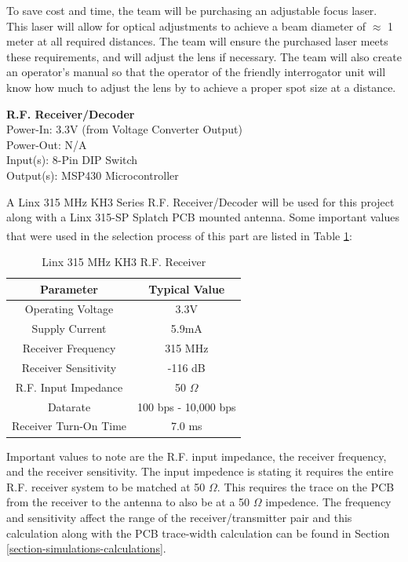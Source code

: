 \documentclass[letterpaper,10pt]{article}
\begin{document}
\begin{spacing}{1.15}
To save cost and time, the team will be purchasing an adjustable focus laser. This laser will allow for optical adjustments to achieve a beam diameter of $\approx$ 1 meter at all required distances. The team will ensure the purchased laser meets these requirements, and will adjust the lens if necessary. The team will also create an operator's manual so that the operator of the friendly interrogator unit will know how much to adjust the lens by to achieve a proper spot size at a distance.

\normalsize\textbf{R.F. Receiver/Decoder} \\
Power-In: 3.3V (from Voltage Converter Output) \\
Power-Out: N/A \\
Input(s): 8-Pin DIP Switch\\
Output(s): MSP430 Microcontroller

A Linx 315 MHz KH3 Series R.F. Receiver/Decoder will be used for this project along with a Linx 315-SP Splatch PCB mounted antenna. Some important values that were used in the selection process of this part are listed in Table \ref{tab:rf-receiver-important-values}\textsuperscript{\cite{Linx-Receiver}\cite{Linx-Antenna}}:

\begin{table}[htbp]
	\centering
	\begin{tabular}{c|c}	%
		\toprule	%
		Parameter & Typical Value \\
		\midrule
		Operating Voltage & 3.3V\\
	 	Supply Current & 5.9mA\\
		Receiver Frequency & 315 MHz \\ 
		Receiver Sensitivity & -116 dB \\
		R.F. Input Impedance & 50 $\Omega$ \\
		Datarate & 100 bps - 10,000 bps  \\
		Receiver Turn-On Time & 7.0 ms  \\
		\bottomrule	%
	\end{tabular}%
	\caption{Linx 315 MHz KH3 R.F. Receiver}
	\label{tab:rf-receiver-important-values}	%
\end{table}%

Important values to note are the R.F. input impedance, the receiver frequency, and the receiver sensitivity. The input impedence is stating it requires the entire R.F. receiver system to be matched at 50 $\Omega$. This requires the trace on the PCB from the receiver to the antenna to also be at a 50 $\Omega$ impedence. The frequency and sensitivity affect the range of the receiver/transmitter pair and this calculation along with the PCB trace-width calculation can be found in Section \ref{section-simulations-calculations}.


\end{spacing}
\end{document}
